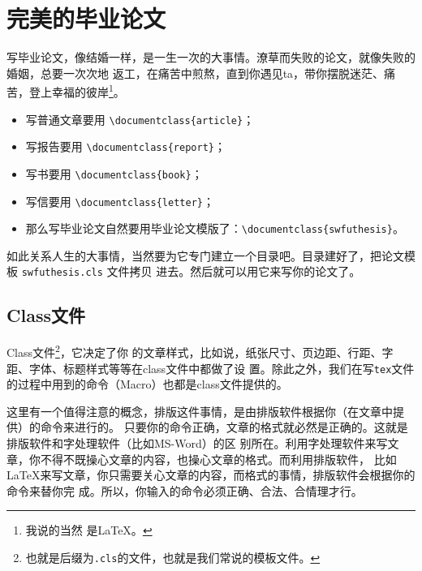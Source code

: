 \chapter{完美的毕业论文}
\label{cha:thesis}

写毕业论文，像结婚一样，是一生一次的大事情。潦草而失败的论文，就像失败的婚姻，总要一次次地
返工，在痛苦中煎熬，直到你遇见ta，带你摆脱迷茫、痛苦，登上幸福的彼岸\footnote{我说的当然
  是\LaTeX{}。}。

\begin{itemize}
\item[] 写普通文章要用 \verb'\documentclass{article}'；
\item[] 写报告要用 \verb'\documentclass{report}'；
\item[] 写书要用 \verb'\documentclass{book}'；
\item[] 写信要用 \verb'\documentclass{letter}'；
\item[] 那么写毕业论文自然要用毕业论文模版了：\verb'\documentclass{swfuthesis}'。
\end{itemize}

如此关系人生的大事情，当然要为它专门建立一个目录吧。目录建好了，把论文模板 \texttt{swfuthesis.cls} 文件拷贝
进去。然后就可以用它来写你的论文了。

\section{Class文件}
\label{sec:class}

Class文件\footnote{也就是后缀为\texttt{.cls}的文件，也就是我们常说的模板文件。}，它决定了你
的文章样式，比如说，纸张尺寸、页边距、行距、字距、字体、标题样式等等在class文件中都做了设
置。除此之外，我们在写\texttt{tex}文件的过程中用到的命令（Macro）也都是class文件提供的。

这里有一个值得注意的概念，排版这件事情，是由排版软件根据你（在文章中提供）的命令来进行的。
只要你的命令正确，文章的格式就必然是正确的。这就是排版软件和字处理软件（比如MS-Word）的区
别所在。利用字处理软件来写文章，你不得不既操心文章的内容，也操心文章的格式。而利用排版软件，
比如\LaTeX{}来写文章，你只需要关心文章的内容，而格式的事情，排版软件会根据你的命令来替你完
成。所以，你输入的命令必须正确、合法、合情理才行。

